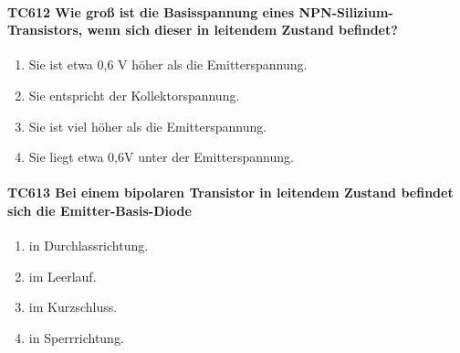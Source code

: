 \documentclass[8pt]{article}
\begin{document}
\begin{enumerate}
\begin{enumerate}[nolistsep,label=\Alph*]
{\begin{enumerate}[nolistsep,label=\Alph*]
\paragraph*{TC612 Wie groß ist die Basisspannung eines NPN-Silizium-Transistors, wenn sich dieser in leitendem Zustand befindet?}
\begin{enumerate}[nolistsep,label=\Alph*]
\item Sie ist etwa 0,6 V höher als die Emitterspannung.
\item Sie entspricht der Kollektorspannung.
\item Sie ist viel höher als die Emitterspannung.
\item Sie liegt etwa 0,6V unter der Emitterspannung.
\end{enumerate}

\paragraph*{TC613 Bei einem bipolaren Transistor in leitendem Zustand befindet sich die Emitter-Basis-Diode}
\begin{enumerate}[nolistsep,label=\Alph*]
\item in Durchlassrichtung.
\item im Leerlauf.
\item im Kurzschluss.
\item in Sperrrichtung.
\end{enumerate}


\end{enumerate}}
\end{enumerate}
\end{enumerate}
\end{document}
